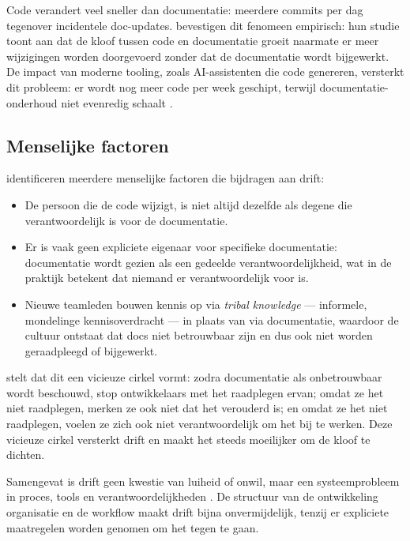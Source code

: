 Code verandert veel sneller dan documentatie: meerdere commits per dag tegenover incidentele doc-updates. \textcite{romeo2024didrift} bevestigen dit fenomeen empirisch: hun studie toont aan dat de kloof tussen code en documentatie groeit naarmate er meer wijzigingen worden doorgevoerd zonder dat de documentatie wordt bijgewerkt. De impact van moderne tooling, zoals AI-assistenten die code genereren, versterkt dit probleem: er wordt nog meer code per week geschipt, terwijl documentatie-onderhoud niet evenredig schaalt \autocite{theunissen2022mappingdocumentation}.

\subsection{Menselijke factoren}
\textcite{bhatti2021docsdevelopers} identificeren meerdere menselijke factoren die bijdragen aan drift:

\begin{itemize}
    \item De persoon die de code wijzigt, is niet altijd dezelfde als degene die verantwoordelijk is voor de documentatie.
    \item Er is vaak geen expliciete eigenaar voor specifieke documentatie: documentatie wordt gezien als een gedeelde verantwoordelijkheid, wat in de praktijk betekent dat niemand er verantwoordelijk voor is.
    \item Nieuwe teamleden bouwen kennis op via \textit{tribal knowledge} --- informele, mondelinge kennisoverdracht --- in plaats van via documentatie, waardoor de cultuur ontstaat dat docs niet betrouwbaar zijn en dus ook niet worden geraadpleegd of bijgewerkt.
\end{itemize}

\textcite{gentle2017docslikecode} stelt dat dit een vicieuze cirkel vormt: zodra documentatie als onbetrouwbaar wordt beschouwd, stop ontwikkelaars met het raadplegen ervan; omdat ze het niet raadplegen, merken ze ook niet dat het verouderd is; en omdat ze het niet raadplegen, voelen ze zich ook niet verantwoordelijk om het bij te werken. Deze vicieuze cirkel versterkt drift en maakt het steeds moeilijker om de kloof te dichten.

Samengevat is drift geen kwestie van luiheid of onwil, maar een systeemprobleem in proces, tools en verantwoordelijkheden \autocite{theunissen2022mappingdocumentation}. De structuur van de ontwikkeling organisatie en de workflow maakt drift bijna onvermijdelijk, tenzij er expliciete maatregelen worden genomen om het tegen te gaan.

